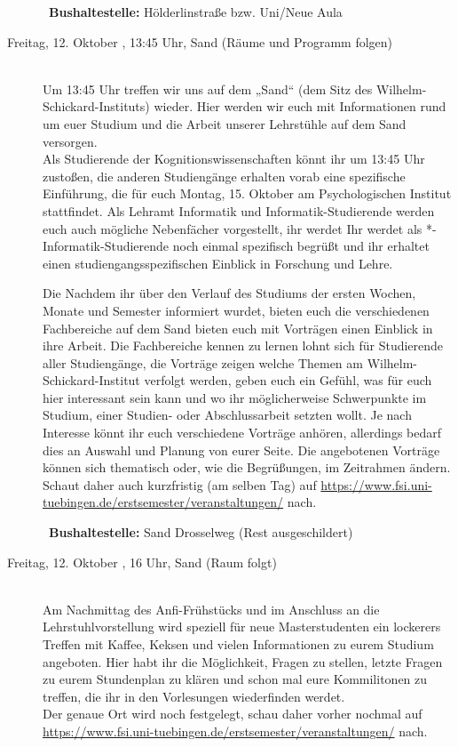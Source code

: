 \begin{description}
~\textbf{Bushaltestelle:} Hölderlinstraße bzw. Uni/Neue Aula
\fi

\item[Freitag, 12. Oktober \Jahr, 13{\ifkogwiss}:45{\fi} Uhr, Sand (Räume und Programm folgen)]\ \\
Um 13{\ifkogwiss}:45{\fi} Uhr treffen wir uns auf dem „Sand“ (dem Sitz des Wilhelm-Schickard-Instituts)
wieder. Hier werden wir euch mit Informationen rund um{\ifkogwiss} {\else} euer Studium und {\fi}die Arbeit unserer Lehrstühle auf dem Sand versorgen.\\

{\ifkogwiss}Als Studierende der Kognitionswissenschaften könnt ihr um 13:45 Uhr zusto{\ss}en, die anderen Studiengänge erhalten vorab eine spezifische Einführung, die für euch Montag, 15. Oktober am Psychologischen Institut stattfindet. {\else}{\ifinfo}Als Lehramt Informatik und Informatik-Studierende werden euch auch mögliche Nebenfächer vorgestellt, ihr werdet {\else}Ihr werdet als *-Informatik-Studierende {\fi}noch einmal spezifisch begrüßt und ihr erhaltet einen studiengangsspezifischen Einblick in Forschung und Lehre.{\fi}

{\ifkogwiss}Die {\else}Nachdem ihr über den Verlauf des Studiums der ersten Wochen, Monate und Semester informiert wurdet, bieten euch die {\fi}verschiedenen Fachbereiche {\ifkogwiss}auf dem Sand bieten euch {\else} {\fi}mit Vorträgen einen Einblick in ihre Arbeit. Die Fachbereiche kennen zu lernen lohnt sich für Studierende aller Studiengänge, die Vorträge zeigen welche Themen am Wilhelm-Schickard-Institut verfolgt werden, geben euch ein Gefühl, was für euch hier interessant sein kann und wo ihr möglicherweise Schwerpunkte im Studium, einer Studien- oder Abschlussarbeit setzten wollt. Je nach Interesse könnt ihr euch verschiedene Vorträge anhören, allerdings bedarf dies an Auswahl und Planung von eurer Seite. Die angebotenen Vorträge können sich thematisch oder, wie die Begrüßungen, im Zeitrahmen ändern. Schaut daher auch kurzfristig (am selben Tag) auf \url{https://www.fsi.uni-tuebingen.de/erstsemester/veranstaltungen/} nach.

~\textbf{Bushaltestelle:} Sand Drosselweg (Rest ausgeschildert)

\ifmaster
\item[Freitag, 12. Oktober \Jahr, 16 Uhr, Sand (Raum folgt)]\ \\
Am Nachmittag des Anfi-Frühstücks und im Anschluss an die Lehrstuhlvorstellung wird speziell für neue Masterstudenten ein lockerers Treffen mit Kaffee, Keksen und vielen Informationen zu eurem Studium angeboten.
Hier habt ihr die Möglichkeit, Fragen zu stellen, letzte Fragen zu eurem Stundenplan zu klären und schon mal eure Kommilitonen zu treffen, die ihr in den Vorlesungen wiederfinden werdet. \\
Der genaue Ort wird noch festgelegt, schau daher vorher nochmal auf \url{https://www.fsi.uni-tuebingen.de/erstsemester/veranstaltungen/} nach.
\fi


\end{description}
